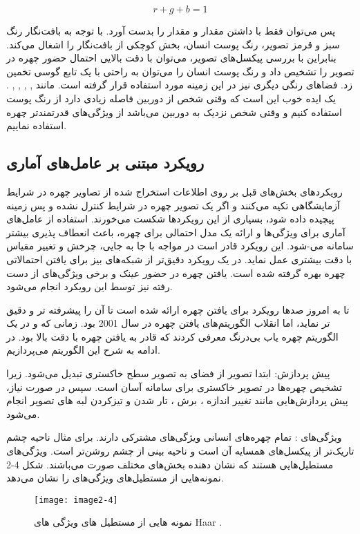 \begin{equation}\label{eq2-3}
r + g + b = 1
\end{equation}
 	
پس می‌توان فقط با داشتن مقدار  و  مقدار  را بدست آورد. با توجه به بافت‌نگار  رنگ سبز و قرمز تصویر، رنگ پوست انسان، بخش کوچکی از بافت‌نگار را اشغال می‌کند. بنابراین با بررسی پیکسل‌های تصویر، می‌توان با دقت بالایی احتمال حضور چهره در تصویر را تشخیص داد و رنگ پوست انسان را می‌توان به راحتی با یک تابع گوسی تخمین زد. فضاهای رنگی دیگری نیز در این زمینه مورد استفاده قرار گرفته است. مانند
,
,
,
,
.
یک ایده خوب این است که وقتی شخص از دوربین فاصله زیادی دارد از رنگ پوست استفاده کنیم و وقتی شخص نزدیک به دوربین می‌باشد از ویژگی‌های قدرتمندتر چهره استفاده نماییم.

\subsection{رویکرد مبتنی بر عامل‌های آماری}
رویکرد‌های بخش‌های قبل بر روی اطلاعات استخراج شده از تصاویر چهره در شرایط آزمایشگاهی تکیه می‌کنند و اگر یک تصویر چهره در شرایط کنترل نشده و پس زمینه پیچیده داده شود، بسیاری از این رویکردها شکست می‌خورند.
استفاده از عامل‌های آماری برای ویژگی‌ها و ارائه یک مدل احتمالی برای چهره، باعث انعطاف پذیری بیشتر سامانه می-شود. این رویکرد قادر است در مواجه با جا به جایی، چرخش و تغییر مقیاس با دقت بیشتری عمل نماید. در یک رویکرد دقیق‌تر از شبکه‌های بیز  برای یافتن احتمالاتی چهره بهره گرفته شده است. یافتن چهره در حضور عینک و برخی ویژگی‌های از دست رفته نیز توسط این رویکرد انجام می‌شود.

\noindent
تا به امروز صدها رویکرد برای یافتن چهره ارائه شده است تا آن را پیشرفته تر و دقیق تر نماید، اما انقلاب الگوریتم‌های یافتن چهره در سال 2001 بود. زمانی که  و  در \cite{990517} یک الگوریتم چهره یاب بی‌درنگ معرفی کردند که قادر به یافتن چهره با دقت بالا بود. در ادامه به شرح این الگوریتم می‌پردازیم.

\noindent
پیش پردازش: ابتدا تصویر از فضای  به تصویر سطح خاکستری تبدیل می‌شود. زیرا تشخیص چهره‌ها در تصویر خاکستری برای سامانه آسان است. سپس در صورت نیاز، پیش پردازش‌هایی مانند تغییر اندازه ، برش ، تار شدن  و تیزکردن لبه های تصویر انجام می‌شود. 

\noindent
ویژگی‌های : تمام چهره‌های انسانی ویژگی‌های مشترکی دارند. برای مثال ناحیه چشم تاریک‌تر از پیکسل‌های همسایه آن است و ناحیه بینی از چشم روشن‌تر است. ویژگی‌های  مستطیل‌هایی هستند که نشان دهنده بخش‌های مختلف صورت می‌باشند. شکل ‏2-4 نمونه‌هایی از مستطیل‌های ویژگی‌های  را نشان می‌دهد.
\begin{figure}[h]
\centering
  \texttt{[image: image2-4]}
  \caption{نمونه هایی از مستطیل های ویژگی های Haar \cite{ref1}.}
  \label{image2-4}
\end{figure}

